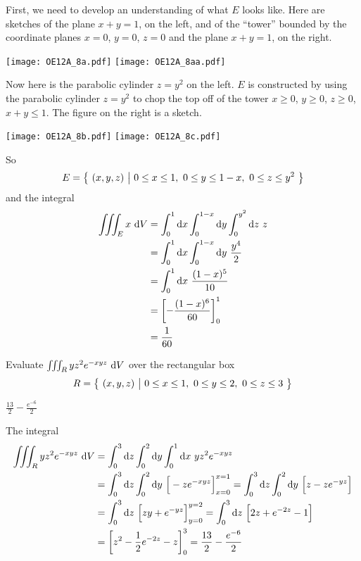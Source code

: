 \begin{solution}
First, we need to develop an understanding of what $E$ looks like.
Here are sketches of the plane $x+y=1$, on the left, and of the ``tower''
bounded by the coordinate planes $x=0$, $y=0$, $z=0$ and the
plane $x+y=1$, on the right.
\begin{center}
     \texttt{[image: OE12A\_8a.pdf]}\qquad
     \texttt{[image: OE12A\_8aa.pdf]}
\end{center}
Now here is the parabolic cylinder $z=y^2$ on the left.
$E$ is constructed by using the parabolic cylinder $z=y^2$ to chop the top
off of the tower $x\ge 0$, $y\ge 0$, $z\ge 0$,  $x+y\le 1$. The figure 
on the right is a sketch.
\begin{center}
     \texttt{[image: OE12A\_8b.pdf]}\qquad
     \texttt{[image: OE12A\_8c.pdf]}
\end{center}
So
\begin{equation*}
E=\big\{ \ (x,y,z)\ \big|\ 0\le x\le 1,\ 0\le y\le 1-x,\ 0\le z\le y^2\ \big\}
\end{equation*}
and the integral
\begin{align*}
\iiint_E x\ \mathrm{d}V
&=\int_0^1\mathrm{d}x\int_0^{1-x}\mathrm{d}y\int_0^{y^2}\mathrm{d}z\ z \\
&=\int_0^1\mathrm{d}x\int_0^{1-x}\mathrm{d}y\ \frac{y^4}{2} \\
&=\int_0^1\mathrm{d}x\ \frac{(1-x)^5}{10} \\
&=\left[-\frac{(1-x)^6}{60}\right]_0^1 \\
&=\frac{1}{60}
\end{align*} 
\end{solution}

\begin{question}[M200 2012D] %
Evaluate  $\tripInt_R yz^2 e^{-xyz}\ \dee{V}$ over the rectangular
box
\begin{equation*}
R=\big\{ \ (x,y,z)\ \big|\ 0\le x\le 1,\ 0\le y\le 2,\  0\le z\le 3\ \big\}
\end{equation*} 
\end{question}

%

\begin{answer}
$\frac{13}{2}-\frac{e^{-6}}{2}$
\end{answer}

\begin{solution}
The integral
\begin{align*}
\iiint_R yz^2 e^{-xyz}\ \mathrm{d}V
&=\int_0^3\mathrm{d}z\int_0^2\mathrm{d}y\int_0^1\mathrm{d}x\ yz^2 e^{-xyz} \\
&=\int_0^3\mathrm{d}z\int_0^2\mathrm{d}y\ \Big[-z e^{-xyz}\Big]_{x=0}^{x=1} 
  =\int_0^3\mathrm{d}z\int_0^2\mathrm{d}y\ \Big[z-z e^{-yz}\Big] \\
&=\int_0^3\mathrm{d}z\ \Big[zy+ e^{-yz}\Big]_{y=0}^{y=2}
=\int_0^3\mathrm{d}z\ \Big[2z+ e^{-2z}-1\Big] \\
&=\left[z^2-\frac{1}{2} e^{-2z}-z\right]_0^3 
=\frac{13}{2}-\frac{e^{-6}}{2}
\end{align*}
\end{solution}

